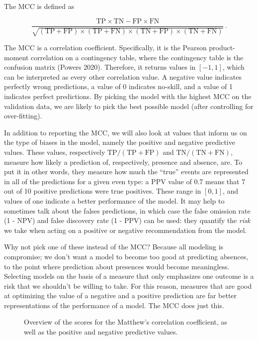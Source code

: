 \documentclass[
  letterpaper,
]{scrbook}
\begin{document}
The MCC is defined as

\[
\frac{\text{TP}\times \text{TN} - \text{FP}\times \text{FN}}{\sqrt{(\text{TP}+\text{FP})\times (\text{TP}+\text{FN})\times (\text{TN}+\text{FP})\times (\text{TN}+\text{FN})}} \,.
\]

The MCC is a correlation coefficient. Specifically, it is the Pearson
product-moment correlation on a contingency table, where the contingency
table is the confusion matrix (Powers 2020). Therefore, it returns
values in \([-1, 1]\), which can be interpreted as every other
correlation value. A negative value indicates perfectly wrong
predictions, a value of 0 indicates no-skill, and a value of 1 indicates
perfect predictions. By picking the model with the highest MCC on the
validation data, we are likely to pick the best possible model (after
controlling for over-fitting).

In addition to reporting the MCC, we will also look at values that
inform us on the type of biases in the model, namely the positive and
negative predictive values. These values, respectively
\(\text{TP}/(\text{TP}+\text{FP})\) and
\(\text{TN}/(\text{TN}+\text{FN})\), measure how likely a prediction of,
respectively, presence and absence, are. To put it in other words, they
measure how much the ``true'' events are represented in all of the
predictions for a given even type: a PPV value of 0.7 means that 7 out
of 10 positive predictions were true positives. These range in
\([0,1]\), and values of one indicate a better performance of the model.
It may help to sometimes talk about the falses predictions, in which
case the false omission rate (1 - NPV) and false discovery rate (1 -
PPV) can be used: they quantify the \emph{risk} we take when acting on a
positive or negative recommendation from the model.

Why not pick one of these instead of the MCC? Because all modeling is
compromise; we don't want a model to become too good at predicting
absences, to the point where prediction about presences would become
meaningless. Selecting models on the basis of a measure that only
emphasizes one outcome is a risk that we shouldn't be willing to take.
For this reason, measures that are good at optimizing the value of a
negative and a positive prediction are far better representations of the
performance of a model. The MCC does just this.

\begin{figure}[pbt]


\caption{\label{fig-classification-crossvalidation}Overview of the
scores for the Matthew's correlation coefficient, as well as the
positive and negative predictive values.}

\end{figure}%
\end{document}
